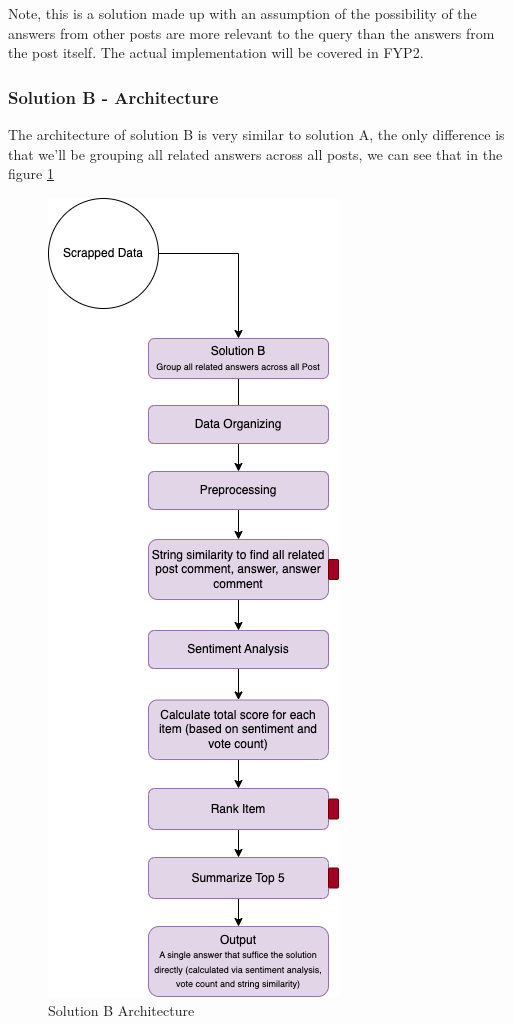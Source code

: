Note, this is a solution made up with an assumption of the possibility of the answers from other posts are more relevant to the query than the answers from the post itself. The actual implementation will be covered in FYP2. 

\subsubsection{Solution B - Architecture}
The architecture of solution B is very similar to solution A, the only difference is that we'll be grouping all related answers across all posts, we can see that in the figure \ref*{solution_b_architecture}

\pagebreak
\begin{figure}[H]
  \centering
  \noindent \includegraphics[scale=0.85]{assets/solution-b.png}
\caption{Solution B Architecture }\label{solution_b_architecture}
\end{figure}

